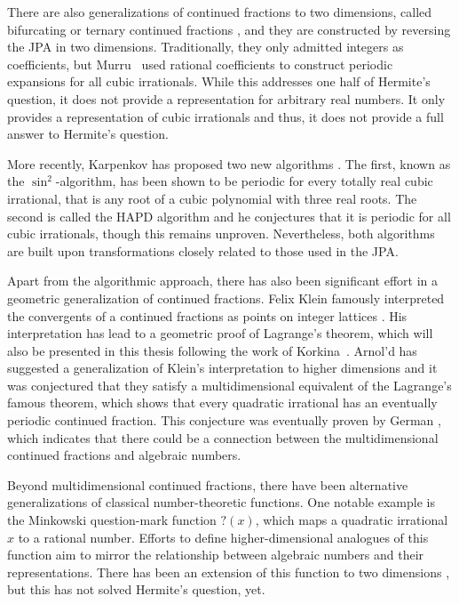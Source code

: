 There are also generalizations of continued fractions to two dimensions,
called bifurcating or ternary continued fractions \cite{Gupta00,Daus22},
and they are constructed by reversing the JPA in two dimensions.
Traditionally, they only admitted integers as coefficients,
but Murru~\cite{Murru15} used rational coefficients to construct periodic
expansions for all cubic irrationals.
While this addresses one half of Hermite’s question,
it does not provide a representation for arbitrary real numbers.
It only provides a representation of cubic irrationals
and thus, it does not provide a full answer to Hermite's question.

More recently, Karpenkov has proposed two new algorithms \cite{Karpenkov24, Karpenkov21}.
The first, known as the $\sin^2$-algorithm, has been shown to be periodic for
every totally real cubic irrational, that is any root of a cubic polynomial
with three real roots.
The second is called the HAPD algorithm and he conjectures that it is periodic
for all cubic irrationals, though this remains unproven.
Nevertheless, both algorithms are built upon transformations closely related to
those used in the JPA.

Apart from the algorithmic approach,
there has also been significant effort in a geometric generalization of
continued fractions.
Felix Klein famously interpreted the convergents of a continued fractions as
points on integer lattices \cite{Klein95}.
His interpretation has lead to a geometric proof of Lagrange’s theorem, which
will also be presented in this thesis following the work of Korkina~\cite{Korkina96}.
Arnol'd has suggested a generalization of Klein's interpretation to higher
dimensions \cite{Arnold98} and it was conjectured that they satisfy a
multidimensional equivalent of the Lagrange's famous theorem,
which shows that every quadratic irrational has an eventually periodic
continued fraction.
This conjecture was eventually proven by German \cite{German08},
which indicates that there could be a connection between the multidimensional
continued fractions and algebraic numbers.

Beyond multidimensional continued fractions, there have been alternative
generalizations of classical number-theoretic functions.
One notable example is the Minkowski question-mark function $?(x)$,
which maps a quadratic irrational $x$ to a rational number.
Efforts to define higher-dimensional analogues of this function aim to mirror
the relationship between algebraic numbers and their representations.
There has been an extension of this function to two dimensions \cite{Beaver04},
but this has not solved Hermite's question, yet.

